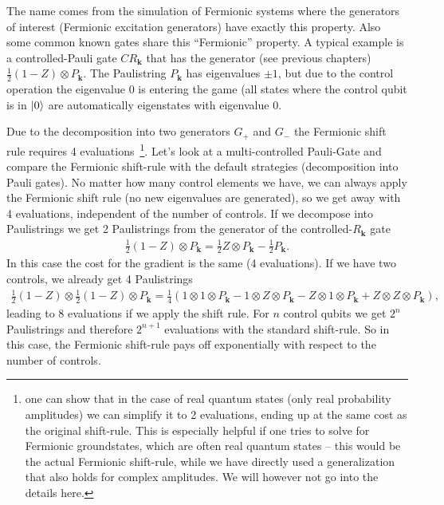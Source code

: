 The name comes from the simulation of Fermionic systems where the generators of interest (Fermionic excitation generators) have exactly this property. Also some common known gates share this ``Fermionic'' property.
A typical example is a controlled-Pauli gate $CR_\mathbf{k}$ that has the generator (see previous chapters) $\frac{1}{2}\left(1-Z\right)\otimes P_\mathbf{k}$. 
The Paulistring $P_\mathbf{k}$ has eigenvalues $\pm 1$, but due to the control operation the eigenvalue $0$ is entering the game (all states where the control qubit is in $\ket{0}$ are automatically eigenstates with eigenvalue $0$.

Due to the decomposition into two generators $G_+$ and $G_-$ the Fermionic shift rule requires 4 evaluations~\footnote{one can show that in the case of real quantum states (only real probability amplitudes) we can simplify it to 2 evaluations, ending up at the same cost as the original shift-rule. This is especially helpful if one tries to solve for Fermionic groundstates, which are often real quantum states -- this would be the actual Fermionic shift-rule, while we have directly used a generalization that also holds for complex amplitudes. We will however not go into the details here.}. 
Let's look at a multi-controlled Pauli-Gate and compare the Fermionic shift-rule with the default strategies (decomposition into Pauli gates). 
No matter how many control elements we have, we can always apply the Fermionic shift rule (no new eigenvalues are generated), so we get away with 4 evaluations, independent of the number of controls. 
If we decompose into Paulistrings we get 2 Paulistrings from the generator of the controlled-$R_\mathbf{k}$ gate
\begin{align*}
    \frac{1}{2}\left(1-Z\right)\otimes P_\mathbf{k} = \frac{1}{2}Z\otimes P_\mathbf{k} -\frac{1}{2}P_\mathbf{k}.
\end{align*}
In this case the cost for the gradient is the same (4 evaluations). 
If we have two controls, we already get 4 Paulistrings
\begin{align*}
    \frac{1}{2}\left(1-Z\right)\otimes \frac{1}{2}\left(1-Z\right) \otimes P_\mathbf{k} = \frac{1}{4}\left(1\otimes 1\otimes P_\mathbf{k}-1\otimes Z\otimes P_\mathbf{k}-Z\otimes 1\otimes P_\mathbf{k}+Z\otimes Z\otimes P_\mathbf{k}\right),
\end{align*}
leading to 8 evaluations if we apply the shift rule. 
For $n$ control qubits we get $2^n$ Paulistrings
and therefore $2^{n+1}$ evaluations with the standard shift-rule. 
So in this case, the Fermionic shift-rule pays off exponentially with respect to the number of controls.

